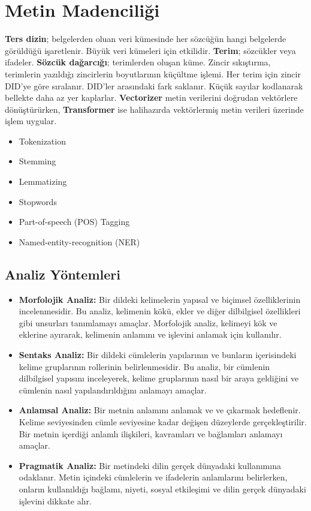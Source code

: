 \section{Metin Madenciliği}
\textbf{Ters dizin}; belgelerden oluan veri kümesinde her sözcüğün hangi belgelerde görüldüğü işaretlenir. Büyük veri kümeleri için etkilidir. \textbf{Terim}; sözcükler veya ifadeler. \textbf{Sözcük dağarcığı}; terimlerden oluşan küme. Zincir sıkıştırma, terimlerin yazıldığı zincirlerin boyutlarının küçültme işlemi. Her terim için zincir DID'ye göre sıralanır. DID'ler arasındaki fark saklanır. Küçük sayılar kodlanarak bellekte daha az yer kaplarlar. \textbf{Vectorizer} metin verilerini doğrudan vektörlere dönüştürürken, \textbf{Transformer} ise halihazırda vektörlermiş metin verileri üzerinde işlem uygular.

\begin{itemize}
    \item Tokenization
    \item Stemming
    \item Lemmatizing
    \item Stopwords
    \item Part-of-speech (POS) Tagging
    \item Named-entity-recognition (NER)
\end{itemize}

\newpage

\subsection{Analiz Yöntemleri}
\begin{itemize}
    \item \textbf{Morfolojik Analiz:} Bir dildeki kelimelerin yapısal ve biçimsel özelliklerinin incelenmesidir. Bu analiz, kelimenin kökü, ekler ve diğer dilbilgisel özellikleri gibi unsurları tanımlamayı amaçlar. Morfolojik analiz, kelimeyi kök ve eklerine ayırarak, kelimenin anlamını ve işlevini anlamak için kullanılır.
    \item \textbf{Sentaks Analiz:} Bir dildeki cümlelerin yapılarının ve bunların içerisindeki kelime gruplarının rollerinin belirlenmesidir. Bu analiz, bir cümlenin dilbilgisel yapısını inceleyerek, kelime gruplarının nasıl bir araya geldiğini ve cümlenin nasıl yapılandırıldığını anlamayı amaçlar.
    \item \textbf{Anlamsal Analiz:} Bir metnin anlamını anlamak ve ve çıkarmak hedeflenir. Kelime seviyesinden cümle seviyesine kadar değişen düzeylerde gerçekleştirilir. Bir metnin içerdiği anlamlı ilişkileri, kavramları ve bağlamları anlamayı amaçlar.
    \item \textbf{Pragmatik Analiz:} Bir metindeki dilin gerçek dünyadaki kullanımına odaklanır. Metin içindeki cümlelerin ve ifadelerin anlamlarını belirlerken, onların kullanıldığı bağlamı, niyeti, sosyal etkileşimi ve dilin gerçek dünyadaki işlevini dikkate alır.
\end{itemize}


